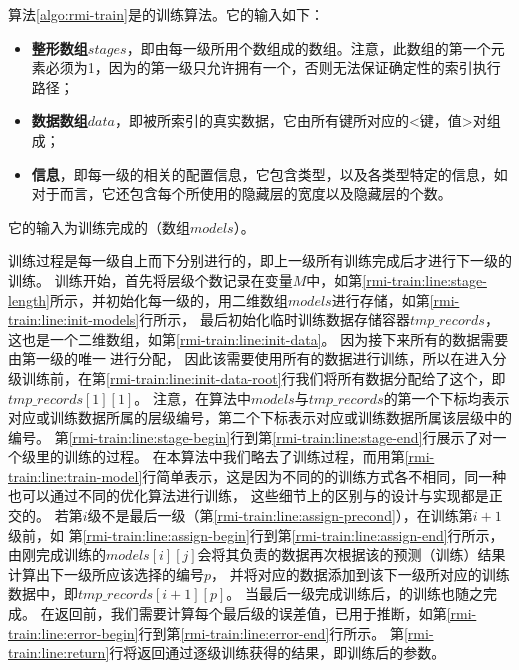 算法\ref{algo:rmi-train}是{\rmi}的训练算法。它的输入如下：
\begin{itemize}
  \item \textbf{整形数组$stages$}，即由{\rmi}每一级所用{\model}个数组成的数组。注意，此数组的第一个元素必须为1，因为{\rmi}的第一级只允许拥有一个{\model}，否则无法保证确定性的索引执行路径；
  \item \textbf{数据数组$data$}，即被{\rmi}所索引的真实数据，它由所有键所对应的<键，{\cdf}值>对组成；
  \item \textbf{{\model}信息}，即每一级的{\model}相关的配置信息，它包含{\model}类型，以及各类型{\model}特定的信息，如对于{\nn}而言，它还包含每个{\nn}所使用的隐藏层的宽度以及隐藏层的个数。
\end{itemize}
它的输入为训练完成的{\rmi}（{\model}数组$models$）。

训练过程是每一级自上而下分别进行的，即上一级所有{\model}训练完成后才进行下一级{\model}的训练。
训练开始，首先将{\model}层级个数记录在变量$M$中，如第\ref{rmi-train:line:stage-length}所示，并初始化{\rmi}每一级的{\model}，用二维数组$models$进行存储，如第\ref{rmi-train:line:init-models}行所示，
最后初始化临时训练数据存储容器$tmp\_records$，这也是一个二维数组，如第\ref{rmi-train:line:init-data}。
因为接下来所有的数据需要由第一级的唯一{\model}进行分配，
因此该{\model}需要使用所有的数据进行训练，所以在进入分级训练前，在第\ref{rmi-train:line:init-data-root}行我们将所有数据分配给了这个{\model}，即$tmp\_records[1][1]$。
注意，在算法中$models$与$tmp\_records$的第一个下标均表示对应{\model}或训练数据所属的层级编号，第二个下标表示对应{\model}或训练数据所属该层级中的{\model}编号。
第\ref{rmi-train:line:stage-begin}行到第\ref{rmi-train:line:stage-end}行展示了对一个级里的{\model}训练的过程。
在本算法中我们略去了{\model}训练过程，而用第\ref{rmi-train:line:train-model}行简单表示，这是因为不同的{\model}的训练方式各不相同，同一种{\model}也可以通过不同的优化算法进行训练，
这些细节上的区别与{\rmi}的设计与实现都是正交的。
若第$i$级不是最后一级（第\ref{rmi-train:line:assign-precond}），在训练第$i+1$级{\model}前，如
第\ref{rmi-train:line:assign-begin}行到第\ref{rmi-train:line:assign-end}行所示，由刚完成训练的{\model}$models[i][j]$会将其负责的数据再次根据该{\model}的预测（训练）结果计算出下一级所应该选择的{\model}编号$p$，
并将对应的数据添加到该下一级{\model}所对应的训练数据中，即$tmp\_records[i+1][p]$。
当最后一级{\model}完成训练后，{\rmi}的训练也随之完成。
在返回前，我们需要计算每个最后级{\model}的误差值，已用于{\rmi}推断，如第\ref{rmi-train:line:error-begin}行到第\ref{rmi-train:line:error-end}行所示。
第\ref{rmi-train:line:return}行将返回通过逐级训练获得的{\model}结果，即训练后的{\model}参数。

